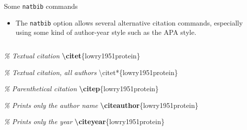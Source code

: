 \documentclass[,aspectratio=43]{beamer}
\newenvironment{Shaded}{\begin{snugshade}}{\end{snugshade}}
\newcommand{\CommentTok}[1]{\textcolor[rgb]{0.38,0.63,0.69}{\textit{#1}}}
\newcommand{\ExtensionTok}[1]{#1}
\newcommand{\FunctionTok}[1]{\textcolor[rgb]{0.02,0.16,0.49}{#1}}
\newcommand{\KeywordTok}[1]{\textcolor[rgb]{0.00,0.44,0.13}{\textbf{#1}}}
\newcommand{\NormalTok}[1]{#1}
\providecommand{\tightlist}{%
  \setlength{\itemsep}{0pt}\setlength{\parskip}{0pt}}
\begin{document}
\begin{frame}[fragile]{Some \texttt{natbib} commands}
\protect\hypertarget{some-natbib-commands}{}
\begin{itemize}
\tightlist
\item
  The \texttt{natbib} option allows several alternative citation
  commands, especially using some kind of author-year style such as the
  APA style.
\end{itemize}

\begin{columns}[T]
\begin{column}{0.53\textwidth}
\small
\vspace{-1em}

\begin{Shaded}
\begin{Highlighting}[]
\CommentTok{\% Textual citation}
\KeywordTok{\textbackslash{}citet}\NormalTok{\{}\ExtensionTok{lowry1951protein}\NormalTok{\}    }

\CommentTok{\% Textual citation, all authors}
\FunctionTok{\textbackslash{}citet*}\NormalTok{\{lowry1951protein\}   }

\CommentTok{\% Parenthetical citation}
\KeywordTok{\textbackslash{}citep}\NormalTok{\{}\ExtensionTok{lowry1951protein}\NormalTok{\}    }

\CommentTok{\% Prints only the author name}
\KeywordTok{\textbackslash{}citeauthor}\NormalTok{\{}\ExtensionTok{lowry1951protein}\NormalTok{\}   }

\CommentTok{\% Prints only the year }
\KeywordTok{\textbackslash{}citeyear}\NormalTok{\{}\ExtensionTok{lowry1951protein}\NormalTok{\} }
\end{Highlighting}
\end{Shaded}
\end{column}


\end{columns}
\end{frame}
\end{document}
